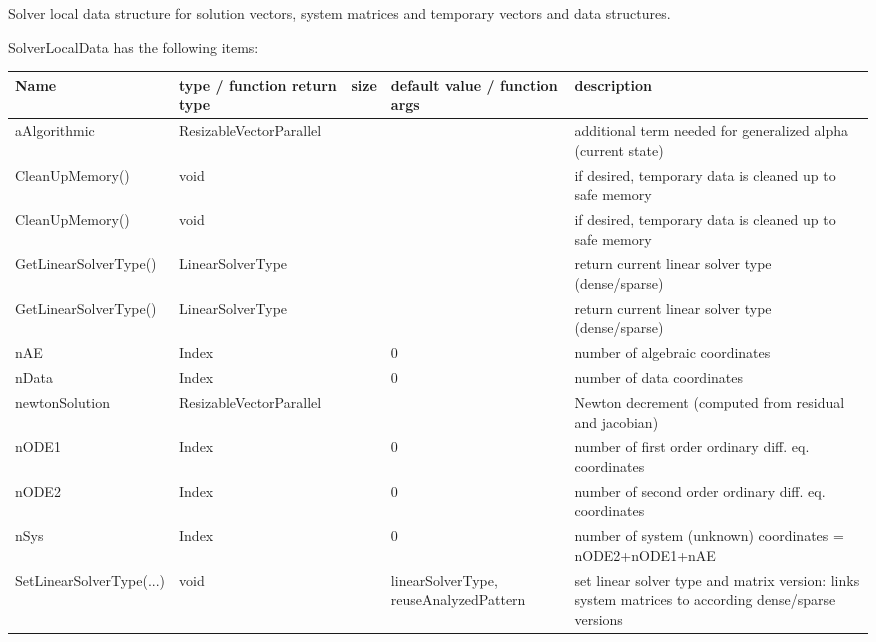 
\label{sec:SolverLocalData}
Solver local data structure for solution vectors, system matrices and temporary vectors and data structures.

\noindent SolverLocalData has the following items:
\begin{center}
  \footnotesize
  \begin{longtable}{| p{4.2cm} | p{2.5cm} | p{0.3cm} | p{3.0cm} | p{6cm} |}
    \hline
    \bf Name & \bf type / function return type & \bf size & \bf default value / function args & \bf description \\ \hline
    aAlgorithmic &     ResizableVectorParallel &      &      &     additional term needed for generalized alpha (current state)\\ \hline
    CleanUpMemory() &     void &      &      &     if desired, temporary data is cleaned up to safe memory\\ \hline
    CleanUpMemory() &     void &      &      &     if desired, temporary data is cleaned up to safe memory\\ \hline
    GetLinearSolverType() &     LinearSolverType &      &      &     return current linear solver type (dense/sparse)\\ \hline
    GetLinearSolverType() &     LinearSolverType &      &      &     return current linear solver type (dense/sparse)\\ \hline
    nAE &     Index &      &     0 &     number of algebraic coordinates\\ \hline
    nData &     Index &      &     0 &     number of data coordinates\\ \hline
    newtonSolution &     ResizableVectorParallel &      &      &     Newton decrement (computed from residual and jacobian)\\ \hline
    nODE1 &     Index &      &     0 &     number of first order ordinary diff. eq. coordinates\\ \hline
    nODE2 &     Index &      &     0 &     number of second order ordinary diff. eq. coordinates\\ \hline
    nSys &     Index &      &     0 &     number of system (unknown) coordinates = nODE2+nODE1+nAE\\ \hline
    SetLinearSolverType(...) &     void &      &     linearSolverType, reuseAnalyzedPattern &     set linear solver type and matrix version: links system matrices to according dense/sparse versions\\ \hline

\end{longtable}
\end{center}
